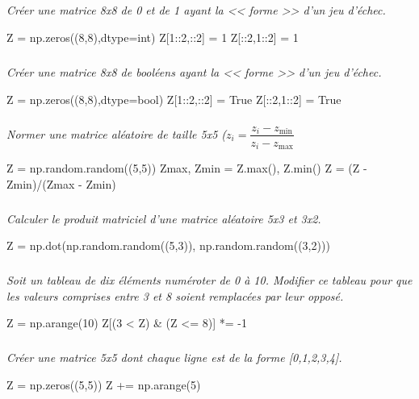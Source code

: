 \documentclass[10pt,fleqn]{article} %
\begin{document}
\begin{multicols}{2}
\subparagraph{}\textit{Créer une matrice 8x8 de 0 et de 1 ayant la << forme >> d'un jeu d'échec. }
\ifprof
\begin{corrige}
\begin{python}
Z = np.zeros((8,8),dtype=int)
Z[1::2,::2] = 1
Z[::2,1::2] = 1 
\end{python}
\end{corrige}
\else
\fi


\subparagraph{}\textit{Créer une matrice 8x8 de booléens ayant la << forme >> d'un jeu d'échec. }
\ifprof
\begin{corrige}
\begin{python}
Z = np.zeros((8,8),dtype=bool)
Z[1::2,::2] = True
Z[::2,1::2] = True
\end{python}
\end{corrige}
\else
\fi


\subparagraph{}\textit{Normer une matrice aléatoire de taille 5x5 ($z_i = \dfrac{z_i-z_{\text{min}}}{z_i-z_{\text{max}}}$}
\ifprof
\begin{corrige}
\begin{python}
Z = np.random.random((5,5))
Zmax, Zmin = Z.max(), Z.min()
Z = (Z - Zmin)/(Zmax - Zmin)
\end{python}
\end{corrige}
\else
\fi


\subparagraph{}\textit{Calculer le produit matriciel d'une matrice aléatoire 5x3 et 3x2.}
\ifprof
\begin{corrige}
\begin{python}
Z = np.dot(np.random.random((5,3)), np.random.random((3,2)))
\end{python}
\end{corrige}
\else
\fi


\subparagraph{}\textit{Soit un tableau de dix éléments numéroter de 0 à 10. Modifier ce tableau pour que les valeurs comprises entre 3 et 8 soient remplacées par leur opposé.}
\ifprof
\begin{corrige}
\begin{python}
Z = np.arange(10)
Z[(3 < Z) & (Z <= 8)] *= -1
\end{python}
\end{corrige}
\else
\fi


\subparagraph{}\textit{Créer une matrice 5x5 dont chaque ligne est de la forme [0,1,2,3,4].}
\ifprof
\begin{corrige}
\begin{python}
Z = np.zeros((5,5))
Z += np.arange(5)
\end{python}
\end{corrige}
\else
\fi



\end{multicols}
\end{document}
